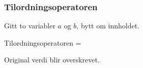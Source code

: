 \begin{frame}
    \frametitle{Tilordningsoperatoren}

    Gitt to variabler $a$ og $b$, bytt om innholdet. 

    Tilordningsoperatoren = 

    Original verdi blir overskrevet. 

\end{frame}
